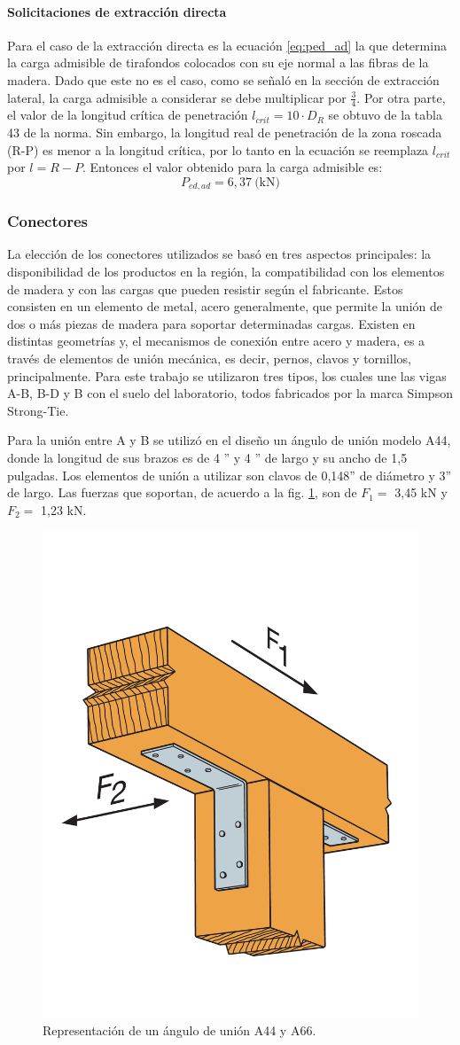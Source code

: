 \paragraph{Solicitaciones de extracción directa}
Para el caso de la extracción directa es la ecuación \ref{eq:ped_ad} la que determina la carga admisible de tirafondos colocados con su eje normal a las fibras de la madera. Dado que este no es el caso, como se señaló en la sección de extracción lateral, la carga admisible a considerar se debe multiplicar por $\frac{3}{4}$. Por otra parte, el valor de la longitud crítica de penetración $l_{crit}=10\cdot D_R$ se obtuvo de la tabla 43 de la norma. Sin embargo, la longitud real de penetración de la zona roscada (R-P) es menor a la longitud crítica, por lo tanto en la ecuación se reemplaza $l_{crit}$ por $l = R-P$. Entonces el valor obtenido para la carga admisible es:
\begin{equation}
	P_{ed,ad} = 6,37 \: \text{(kN)}
\end{equation} 

\subsubsection{Conectores}
La elección de los conectores utilizados se basó en tres aspectos principales: la disponibilidad de los productos en la región, la compatibilidad con los elementos de madera y con las cargas que pueden resistir según el fabricante. Estos consisten en un elemento de metal, acero generalmente, que permite la unión de dos o más piezas de madera para soportar determinadas cargas. Existen en distintas geometrías y, el mecanismos de conexión entre acero y madera, es a través de elementos de unión mecánica, es decir, pernos, clavos y tornillos, principalmente. Para este trabajo se utilizaron tres tipos, los cuales une las vigas A-B, B-D y B con el suelo del laboratorio, todos fabricados por la marca Simpson Strong-Tie.

Para la unión entre A y B se utilizó en el diseño un ángulo de unión modelo A44, donde la longitud de sus brazos es de 4 '' y 4 '' de largo y su ancho de 1,5 pulgadas. Los elementos de unión a utilizar son clavos de 0,148'' de diámetro y 3'' de largo. Las fuerzas que soportan, de acuerdo a la fig. \ref{fig:a24}, son de $F_1=$ 3,45 kN y $F_2=$ 1,23 kN. 

\begin{figure}[h]
\centering
\includegraphics[width=0.3\linewidth]{Imagenes/a24.pdf}
\caption{Representación de un ángulo de unión A44 y A66. \cite{angleconnector}}
\label{fig:a24}
\end{figure} 

